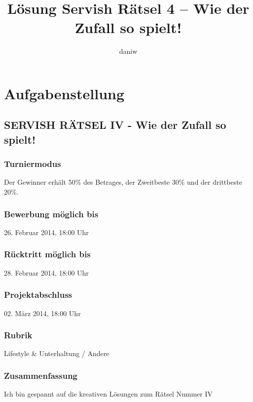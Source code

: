 \documentclass[a4paper, 10pt, fleqn]{article}
\title{Lösung Servish Rätsel 4 -- Wie der Zufall so spielt!}
\author{daniw}
\begin{document}
\maketitle
\newpage
\tableofcontents
\newpage

\section{Aufgabenstellung}

\subsection*{SERVISH RÄTSEL IV - Wie der Zufall so spielt!}

\subsubsection*{Turniermodus}
Der Gewinner erhält 50\% des Betrages, der Zweitbeste 30\% und der drittbeste 20\%. 

\subsubsection*{Bewerbung möglich bis}
26. Februar 2014, 
18:00 Uhr 

\subsubsection*{Rücktritt möglich bis}
28. Februar 2014, 
18:00 Uhr 

\subsubsection*{Projektabschluss}
02. März 2014, 
18:00 Uhr 

\subsubsection*{Rubrik}
Lifestyle \& Unterhaltung / Andere

\subsubsection*{Zusammenfassung}
Ich bin gespannt auf die kreativen Lösungen zum Rätsel Nummer IV
\end{document}
